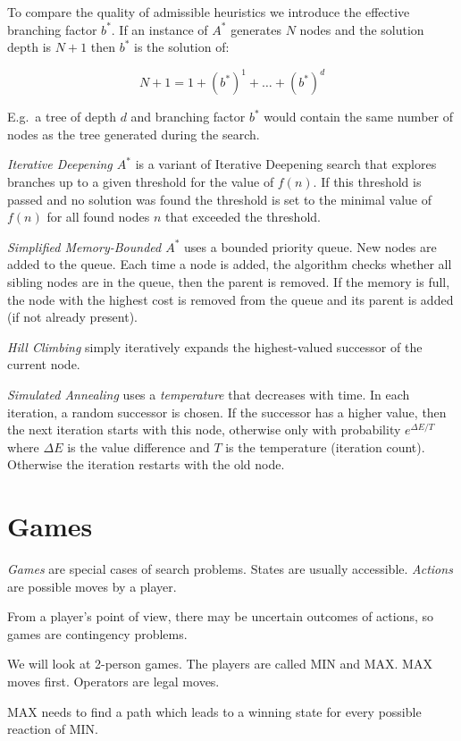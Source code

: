 \documentclass[english]{panikzettel}
\begin{document}
To compare the quality of admissible heuristics we introduce the effective branching factor $b^\ast$. If an instance of $A^\ast$ generates $N$ nodes and the solution depth is $N+1$ then $b^\ast$ is the solution of:

\[N+1 = 1 + \left(b^\ast \right)^1  + \dots + \left(b^\ast\right)^d\]

E.g.\ a tree of depth $d$ and branching factor $b^\ast$ would contain the same number of nodes as the tree generated during the search.

\emph{Iterative Deepening $A^\ast$} is a variant of Iterative Deepening search that explores branches up to a given threshold for the value of $f(n)$. If this threshold is passed and no solution was found the threshold is set to the minimal value of $f(n)$ for all found nodes $n$ that exceeded the threshold.

\emph{Simplified Memory-Bounded $A^\ast$} uses a bounded priority queue. New nodes are added to the queue.
Each time a node is added, the algorithm checks whether all sibling nodes are in the queue, then the parent is removed.
If the memory is full, the node with the highest cost is removed from the queue and its parent is added (if not already present).

\emph{Hill Climbing} simply iteratively expands the highest-valued successor of the current node.

\emph{Simulated Annealing} uses a \emph{temperature} that decreases with time. In each iteration, a random successor is chosen.
If the successor has a higher value, then the next iteration starts with this node, otherwise only with probability $e^{\Delta E / T}$ where $\Delta E$ is the value difference and $T$ is the temperature (iteration count).
Otherwise the iteration restarts with the old node.

\newpage
\section{Games}

\emph{Games} are special cases of search problems.
States are usually accessible.
\emph{Actions} are possible moves by a player.

From a player's point of view, there may be uncertain outcomes of actions, so games are contingency problems.

We will look at 2-person games.
The players are called MIN and MAX.
MAX moves first.
Operators are legal moves.

MAX needs to find a path which leads to a winning state for every possible reaction of MIN.
\end{document}
